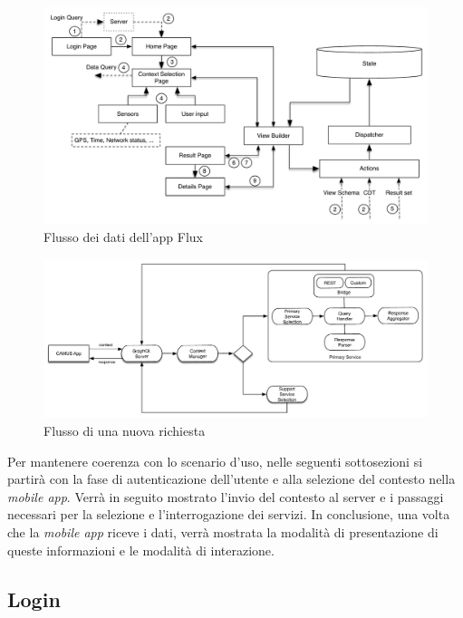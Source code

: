 
\begin{figure}[ht]
	\centering
	\includegraphics[width=\textwidth]{4-progettazione-alto-livello/Immagini/app_dataflow.pdf}
	\caption{Flusso dei dati dell'app Flux}\label{fig:app-dataflow}
\end{figure}

\begin{figure}[ht]
	\centering
	\includegraphics[width=\textwidth]{4-progettazione-alto-livello/Immagini/flusso-richiesta-backend.pdf}
	\caption{Flusso di una nuova richiesta\label{fig:flusso-nuova-richiesta}}
\end{figure}

Per mantenere coerenza con lo scenario d'uso, nelle seguenti sottosezioni si partirà con la fase di autenticazione dell'utente e alla selezione del contesto nella \emph{mobile app}. Verrà in seguito mostrato l'invio del contesto al server e i passaggi necessari per la selezione e l'interrogazione dei servizi. In conclusione, una volta che la \emph{mobile app} riceve i dati, verrà mostrata la modalità di presentazione di queste informazioni e le modalità di interazione.

\subsection*{Login}

